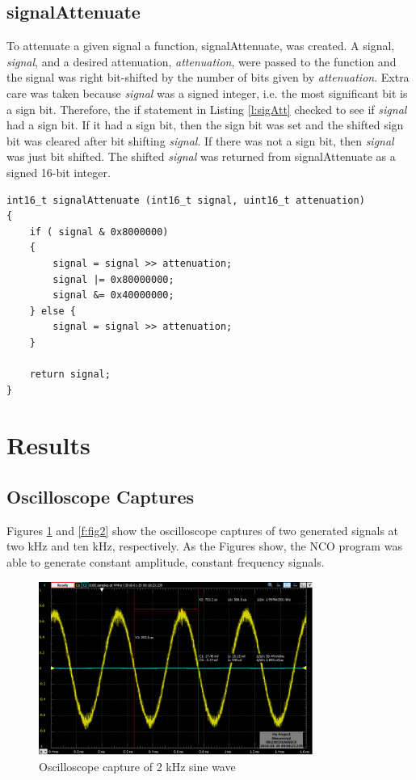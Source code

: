 \documentclass[11pt,pdftex,portrait,letterpaper]{article}
\begin{document}
\subsection{signalAttenuate}

To attenuate a given signal a function, signalAttenuate, was created. A signal, \textit{signal}, and a desired attenuation, \textit{attenuation}, were passed to the function and the signal was right bit-shifted  by the number of bits given by \textit{attenuation}. Extra care was taken because \textit{signal} was a signed integer, i.e. the most significant bit is a sign bit. Therefore, the if statement in Listing \ref{l:sigAtt} checked to see if \textit{signal} had a sign bit. If it had a sign bit, then the sign bit was set and the shifted sign bit was cleared after bit shifting \textit{signal}. If there was not a sign bit, then \textit{signal} was just bit shifted. The shifted \textit{signal} was returned from signalAttenuate as a signed 16-bit integer. 

\begin{lstlisting}[caption={Function to attenuate a given signal, signalAttenuate}, label=l:sigAtt]
int16_t signalAttenuate (int16_t signal, uint16_t attenuation)
{
	if ( signal & 0x8000000)
	{
		signal = signal >> attenuation;
		signal |= 0x80000000;
		signal &= 0x40000000;
	} else {
		signal = signal >> attenuation;
	}
	
	return signal;
}
\end{lstlisting}

\section{Results}

\subsection{Oscilloscope Captures}

Figures \ref{f:fig1} and \ref{f:fig2} show the oscilloscope captures of two generated signals at two kHz and ten kHz, respectively. As the Figures show, the NCO program was able to generate constant amplitude, constant frequency signals. 

\begin{figure}[h]
\centering
\includegraphics[width=0.8\textwidth]{./2000hzOscope}
\caption{Oscilloscope capture of 2 kHz sine wave}
\label{f:fig1}
\end{figure}
\end{document}
